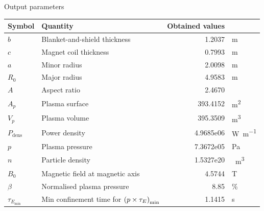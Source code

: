 \documentclass[hyperref={colorlinks=true,urlcolor=blue,linkcolor=.},aspectratio=1610,mathserif]{beamer}
\begin{document}
\begin{frame}{Output parameters}
    \begin{table}
	\begin{tabular}{llrl}
		\toprule
		Symbol                    & Quantity                                                       & Obtained values    &              \\
		\midrule
		\(b\)                     & Blanket-and-shield thickness                                   & 1.2037 &\si{\meter}              \\
		\(c\)                     & Magnet coil thickness                                          & 0.7993&\si{\meter}              \\
		\(a\)                     & Minor radius                                                   & 2.0098&\si{\meter}              \\
		\(R_0\)                   & Major radius                                                   & 4.9583&\si{\meter}              \\
		\(A\)                     & Aspect ratio                                                   & 2.4670 &                          \\
		\(A_p\)                   & Plasma surface                                                 & 393.4152&\si{\meter\squared}    \\
		\(V_p\)                   & Plasma volume                                                  & 395.3509&\si{\meter\cubed}      \\
		\(P_\mathrm{dens}\)       & Power density                                                  & 4.9685e06&\si{\watt\per\meter}  \\
		\(p\)                     & Plasma pressure                                                & 7.3672e05&\si{\pascal}          \\
		\(n\)                     & Particle density                                               & 1.5327e20&\si{\per\meter\cubed} \\
		\(B_0\)                   & Magnetic field at magnetic axis                                & 4.5744&\si{\tesla}              \\
		\(\beta\)                 & Normalised plasma pressure                                     & 8.85 &\%                           \\
		\(\tau_{E_\mathrm{min}}\) & Min confinement time for \(\pqty{p\times\tau_E}_\mathrm{min}\) & 1.1415&\si{\second}             \\
		\bottomrule
	\end{tabular}
\end{table}
\end{frame}
\end{document}
